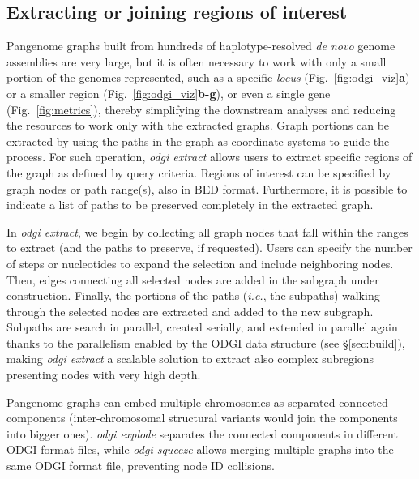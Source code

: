 \documentclass{bioinfo}
\begin{document}
\subsection{Extracting or joining regions of interest}
\label{sec:extract}

Pangenome graphs built from hundreds of haplotype-resolved \textit{de novo} genome assemblies are very large, but it is often necessary to work with only a small portion of the genomes represented,
such as a specific \textit{locus} (Fig.~\ref{fig:odgi_viz}\textbf{a}) or a smaller region (Fig.~\ref{fig:odgi_viz}\textbf{b-g}), or even a single gene (Fig.~\ref{fig:metrics}),
thereby simplifying the downstream analyses and reducing the resources to work only with the extracted graphs.
Graph portions can be extracted by using the paths in the graph as coordinate systems to guide the process. For such operation, \textit{odgi extract} allows users to extract specific regions of the graph as defined by query criteria.
Regions of interest can be specified by graph nodes or path range(s), also in BED format. Furthermore, it is possible to indicate a list of paths to be preserved completely in the extracted graph.

In \textit{odgi extract}, we begin by collecting all graph nodes that fall within the ranges to extract (and the paths to preserve, if requested).
Users can specify the number of steps or nucleotides to expand the selection and include neighboring nodes.
Then, edges connecting all selected nodes are added in the subgraph under construction.
Finally, the portions of the paths (\textit{i.e.}, the subpaths) walking through the selected nodes are extracted and added to the new subgraph.
Subpaths are search in parallel, created serially, and extended in parallel again thanks to the parallelism enabled by the ODGI data structure (see \S\ref{sec:build}), making \textit{odgi extract} a scalable solution to extract also complex subregions presenting nodes with very high depth.


Pangenome graphs can embed multiple chromosomes as separated connected components (inter-chromosomal structural variants would join the components into bigger ones).
\textit{odgi explode} separates the connected components in different ODGI format files, while \textit{odgi squeeze} allows merging multiple graphs into the same ODGI format file, preventing node ID collisions.
\end{document}
